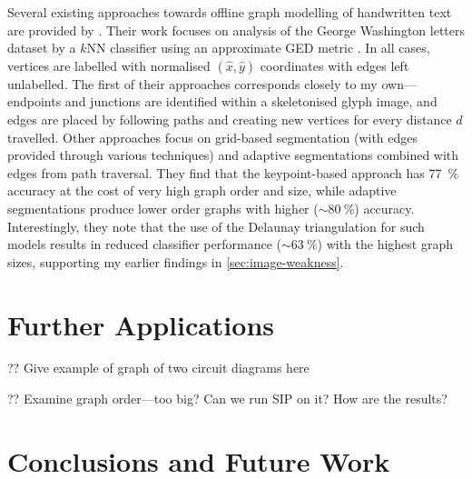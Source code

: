 \documentclass{mpaper}
\begin{document}
Several existing approaches towards offline graph modelling of handwritten text are provided by \citeauthor{Graphs-Handwriting} \cite{Graphs-Handwriting}.
Their work focuses on analysis of the George Washington letters dataset by a $k$NN classifier using an approximate GED metric \cite{GED-Approx}.
In all cases, vertices are labelled with normalised $(\hat{x}, \hat{y})$ coordinates with edges left unlabelled.
The first of their approaches corresponds closely to my own---endpoints and junctions are identified within a skeletonised glyph image, and edges are placed by following paths and creating new vertices for every distance $d$ travelled.
Other approaches focus on grid-based segmentation (with edges provided through various techniques) and adaptive segmentations combined with edges from path traversal.
They find that the keypoint-based approach has \SI{77}{\percent} accuracy at the cost of very high graph order and size, while adaptive segmentations produce lower order graphs with higher ($\sim\SI{80}{\percent}$) accuracy.
Interestingly, they note that the use of the Delaunay triangulation for such models results in reduced classifier performance ($\sim\SI{63}{\percent}$) with the highest graph sizes, supporting my earlier findings in \cref{sec:image-weakness}.


\section{Further Applications}
\label{sec:applications}

?? Give example of graph of two circuit diagrams here

?? Examine graph order---too big? Can we run SIP on it? How are the results?

\section{Conclusions and Future Work}
\label{sec:conclusion}
\end{document}
